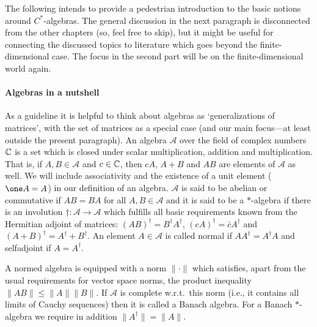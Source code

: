 \documentclass[11pt,a4paper]{article}
\theoremstyle{plain}
\theoremstyle{definition}
\theoremstyle{remark}
\numberwithin{equation}{section}
\begin{document}
The following intends to provide a pedestrian introduction to the basic notions around $C^\ast$-algebras. The general discussion in the next paragraph is disconnected from the other chapters (so, feel free to skip), but it might be useful for connecting the discussed topics to literature which goes beyond the finite-dimensional case. The focus in the second part will be on the finite-dimensional world again.

\paragraph{Algebras in a nutshell}
As a guideline it is helpful to think about algebras as `generalizations of matrices', with the set of matrices as a special case (and our main focus---at least outside the present paragraph). An algebra $\mathcal{A}$ over the field of complex numbers $\mathbb{C}$ is a set which is closed under scalar multiplication, addition and multiplication. That is, if $A,B\in \mathcal{A}$ and $c\in \mathbb{C}$, then $cA$, $A+B$ and $AB$ are elements of $\mathcal{A}$ as well. We will include associativity and the existence of a unit element ($\one A=A$) in our definition of an algebra. $\mathcal{A}$ is said to be abelian or commutative if $AB=BA$ for all $A,B\in \mathcal{A}$ and it is said to be a $\ast$-algebra if there is an involution $\dagger:\mathcal{A}\to \mathcal{A}$ which fulfills all basic requirements known from the Hermitian adjoint of matrices: $(AB)^\dagger=B^\dagger A^\dagger$, $(cA)^\dagger=\bar{c}A^\dagger$ and $(A+B)^\dagger=A^\dagger+B^\dagger$. An element $A\in \mathcal{A}$ is called normal if $AA^\dagger=A^\dagger A$ and selfadjoint if $A=A^\dagger$.

A normed algebra is equipped with a norm $\|\cdot\|$ which satisfies, apart from the usual requirements for vector space norms, the product inequality $\|AB\|\le \|A\| \|B\|$. If $\mathcal{A}$ is complete w.r.t.\ this norm (i.e., it contains all limits of Cauchy sequences) then it is called a Banach algebra. For a Banach $\ast$-algebra we require in addition $\|A^\dagger\|=\|A\|$.
\end{document}
